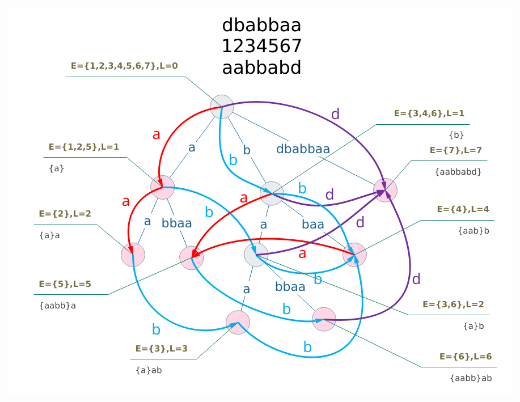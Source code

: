 \documentclass[main.tex]{subfiles}
\begin{document}
\begin{center}
\includegraphics[width=0.8\linewidth]{assets/sam.png}
\end{center}
\end{document}
